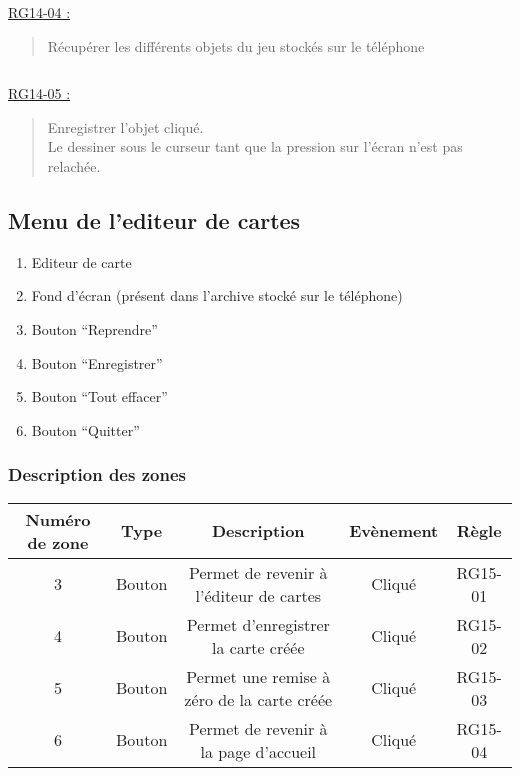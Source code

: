 \documentclass{report}
\begin{document}
			$\,$
			
			\underline{RG14-04 :}
				\begin{quote}
				Récupérer les différents objets du jeu stockés sur le téléphone
				\end{quote}
				
			$\,$
			
			\underline{RG14-05 :}
				\begin{quote}
				Enregistrer l'objet cliqué.\\
				Le dessiner sous le curseur tant que la pression sur l'écran n'est pas relachée.
				\end{quote}
				
				
\newpage

	\subsection{Menu de l'editeur de cartes}
		
		\hypertarget{Menu de l'editeur de cartes}{}
		\label{Menu de l'editeur de cartes}
			
		\begin{center}
			
		\end{center}
		
		\begin{enumerate}
		  \item Editeur de carte
		  \item Fond d'écran (présent dans l'archive stocké sur le téléphone)
		  \item Bouton ``Reprendre''
		  \item Bouton ``Enregistrer''
		  \item Bouton ``Tout effacer''
		  \item Bouton ``Quitter''
		\end{enumerate}

		\subsubsection{Description des zones}
		
			\begin{tabular}{|c|c|c|c|c|} \hline
				Numéro de zone & Type  & Description & Evènement &	Règle \\\hline
				3 & Bouton & Permet de revenir à l'éditeur de cartes & Cliqué & RG15-01 \\\hline
				4 & Bouton & Permet d'enregistrer la carte créée & Cliqué & RG15-02 \\\hline
				5 & Bouton & Permet une remise à zéro de la carte créée & Cliqué & RG15-03 \\\hline
				6 & Bouton & Permet de revenir à la page d'accueil & Cliqué & RG15-04 \\\hline
			\end{tabular}
			
\end{document}
